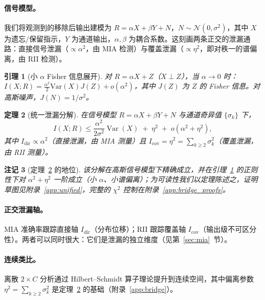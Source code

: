\documentclass[11pt,a4paper]{article}
\newtheorem{theorem}{定理}[section]
\newtheorem{lemma}[theorem]{引理}
\newtheorem{remark}[theorem]{注记}
\begin{document}
\paragraph{信号模型。}
我们将观测到的移除后输出建模为 $R = \alpha X + \beta Y + N$，$N \sim \mathcal{N}(0,\sigma^2)$，其中 $X$ 为遗忘/保留指示，$Y$ 为通道输出，$\alpha,\beta$ 为耦合系数。这刻画两条正交的泄漏通路：直接信号泄漏（$\propto \alpha^2$，由 MIA 检测）与覆盖泄漏（$\propto \eta^2$，即对秩一的谱偏离，由 RII 检测）。

\begin{lemma}[小 $\alpha$ Fisher 信息展开]
\label{lem:fisher}
对 $R = \alpha X + Z$（$X \perp Z$），当 $\alpha \to 0$ 时：
$I(X;R) = \frac{\alpha^2}{2}\mathrm{Var}(X)J(Z) + o(\alpha^2)$，其中 $J(Z)$ 为 $Z$ 的 Fisher 信息。对高斯噪声，$J(N) = 1/\sigma^2$。
\end{lemma}

\begin{theorem}[统一泄漏分解]
\label{thm:unified}
在信号模型 $R = \alpha X + \beta Y + N$ 与通道奇异值 $\{\sigma_k\}$ 下，
\begin{equation}
I(X; R) \le \frac{\alpha^2}{2\sigma^2}\operatorname{Var}(X) \;+\; \eta^2 \;+\; o(\alpha^2 + \eta^2),
\end{equation}
其中 $I_{\mathrm{dir}} \propto \alpha^2$（直接泄漏，由 MIA 测量）且 $I_{\mathrm{cov}} = \eta^2 = \sum_{k\ge 2}\sigma_k^2$（覆盖泄漏，由 RII 测量）。
\end{theorem}

\begin{remark}[定理~\ref{thm:unified} 的地位]
\label{rem:unified_status}
该分解在高斯信号模型下精确成立，并在引理~\ref{lem:fisher} 的正则性下对 $\alpha^2+\eta^2$ 一阶成立（小 $\alpha$、小谱偏离）；为可读性我们以定理陈述之，证明草图见附录~\ref{app:unified}，完整的 $\chi^2$ 控制在附录~\ref{app:bridge_proofs}。
\end{remark}

\paragraph{正交泄漏轴。}
MIA 准确率跟踪直接轴 $I_{\mathrm{dir}}$（分布位移）；RII 跟踪覆盖轴 $I_{\mathrm{cov}}$（输出级不可区分性）。两者可以同时很大：它们是泄漏的独立维度（见第~\ref{sec:mia}~节）。

\paragraph{连续类比。}
离散 $2\times C$ 分析通过 Hilbert--Schmidt 算子理论提升到连续空间，其中偏离参数 $\eta^2=\sum_{k\ge2}\sigma_k^2$ 是定理~\ref{thm:unified} 的基础（附录~\ref{app:bridge}）。




\end{document}

